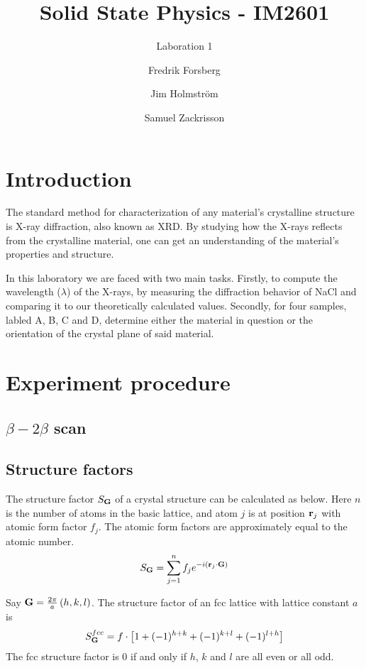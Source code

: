 \documentclass[a4paper,twoside=false,abstract=false,numbers=noenddot,
titlepage=false,headings=small,parskip=half,version=last]{scrartcl}
\title{Solid State Physics - IM2601}
\subtitle{Laboration 1}
\author[1]{Fredrik Forsberg}
\author[1]{Jim Holmström}
\author[1]{Samuel Zackrisson}
\affil[1]{Engineering Physics, Royal Institute of Technology}
\affil[1]{\{fforsber, jimho, samuelz\}@kth.se}
\begin{document}
\maketitle
\thispagestyle{empty}

\section{Introduction}
The standard method for characterization of any material's crystalline structure is X-ray diffraction, also known as XRD.
By studying how the X-rays reflects from the crystalline material, one can get an understanding of the material's properties and structure.

In this laboratory we are faced with two main tasks.
Firstly, to compute the wavelength ($\lambda$) of the X-rays, by measuring the diffraction behavior of NaCl and comparing it to our theoretically calculated values.
Secondly, for four samples, labled A, B, C and D, determine either the material in question or the orientation of the crystal plane of said material.

\section{Experiment procedure}
\subsection{$\beta-2\beta$ scan}

\subsection{Structure factors}
The structure factor $S_{\bold{G}}$ of a crystal structure can be calculated as below. Here $n$ is the number of atoms in the basic lattice, and atom $j$ is at position $\bold{r}_j$ with atomic form factor $f_j$. The atomic form factors are approximately equal to the atomic number.\\
\begin{equation}
    S_{\bold{G}} = \sum^n_{j=1} f_j e^{-i \left( \bold{r}_j \cdot \bold{G}\right)}
\end{equation}

Say $\bold{G} = \frac{2\pi}{a}\left( h,k,l \right)$. The structure factor of an fcc lattice with lattice constant $a$ is
\begin{equation}
    S^{fcc}_{\bold{G}} = f\cdot \left[ 1 + (-1)^{h+k} + (-1)^{k+l} + (-1)^{l+h}\right]
\end{equation}
The fcc structure factor is 0 if and only if $h$, $k$ and $l$ are all even or all odd.\\
\end{document}
